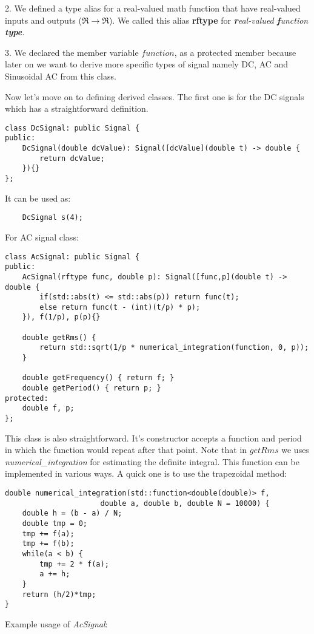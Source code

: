 \documentclass{article}
\begin{document}
	2. We defined a type alias for a real-valued math function that have real-valued inputs and outputs ($\Re\rightarrow\Re$). We called this alias \textbf{rftype} for \textit{\textbf{r}eal-valued \textbf{f}unction \textbf{type}.}
	
	3. We declared the member variable $function$, as a protected member because later on we want to derive more specific types of signal namely DC, AC and Sinusoidal AC from this class.
	 
	Now let's move on to defining derived classes. The first one is for the DC signals which has a straightforward definition.
	
	\begin{verbatim}
class DcSignal: public Signal {
public:
    DcSignal(double dcValue): Signal([dcValue](double t) -> double {
        return dcValue;
    }){}
};
	\end{verbatim}
	
	It can be used as:
	
	\begin{verbatim}
	DcSignal s(4);
	\end{verbatim}
	
	For AC signal class:
	\begin{verbatim}
class AcSignal: public Signal {
public:
    AcSignal(rftype func, double p): Signal([func,p](double t) -> double {
        if(std::abs(t) <= std::abs(p)) return func(t);
        else return func(t - (int)(t/p) * p);
    }), f(1/p), p(p){}
		
    double getRms() {
        return std::sqrt(1/p * numerical_integration(function, 0, p));
    }
		
    double getFrequency() { return f; }
    double getPeriod() { return p; }
protected:
    double f, p;
};
	\end{verbatim}

	This class is also straightforward.
	It's constructor accepts a function and period in which the function would repeat after that point.
	Note that in $getRms$ we uses \textit{numerical\_integration} for estimating the definite integral. 
	This function can be implemented in various ways. 
	A quick one is to use the trapezoidal method:
	
	\begin{verbatim}
double numerical_integration(std::function<double(double)> f,
                      double a, double b, double N = 10000) {
    double h = (b - a) / N;
    double tmp = 0;
    tmp += f(a);
    tmp += f(b);
    while(a < b) {
        tmp += 2 * f(a);
        a += h;
    }
    return (h/2)*tmp;
}
	\end{verbatim}
	Example usage of \textit{AcSignal}:
	
\end{document}

